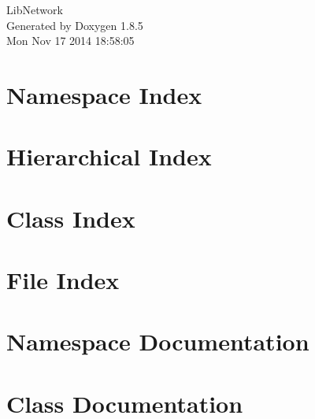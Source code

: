 \documentclass[twoside]{book}
\newcommand{\clearemptydoublepage}{%
  \newpage{\pagestyle{empty}\cleardoublepage}%
}
\begin{document}
\hypersetup{pageanchor=false}
\begin{titlepage}
\vspace*{7cm}
\begin{center}%
{\Large Lib\-Network }\\
\vspace*{1cm}
{\large Generated by Doxygen 1.8.5}\\
\vspace*{0.5cm}
{\small Mon Nov 17 2014 18:58:05}\\
\end{center}
\end{titlepage}
\clearemptydoublepage
\tableofcontents
\clearemptydoublepage
{}
\hypersetup{pageanchor=true}

\chapter{Namespace Index}

\chapter{Hierarchical Index}

\chapter{Class Index}

\chapter{File Index}

\chapter{Namespace Documentation}

\chapter{Class Documentation}




















\end{document}
